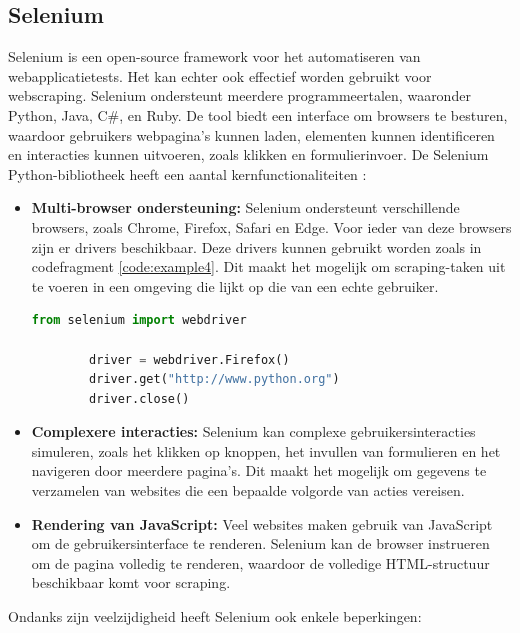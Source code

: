 \subsection{Selenium}
Selenium is een open-source framework voor het automatiseren van webapplicatietests. Het kan echter ook effectief worden gebruikt voor webscraping. Selenium ondersteunt meerdere programmeertalen, waaronder Python, Java, C#, en Ruby. De tool biedt een interface om browsers te besturen, waardoor gebruikers webpagina's kunnen laden, elementen kunnen identificeren en interacties kunnen uitvoeren, zoals klikken en formulierinvoer. De Selenium Python-bibliotheek heeft een aantal kernfunctionaliteiten \autocite{Muthukadan2011}:

\begin{itemize}
    \item \textbf{Multi-browser ondersteuning:} Selenium ondersteunt verschillende browsers, zoals Chrome, Firefox, Safari en Edge. Voor ieder van deze browsers zijn er drivers beschikbaar. Deze drivers kunnen gebruikt worden zoals in codefragment \ref{code:example4}. Dit maakt het mogelijk om scraping-taken uit te voeren in een omgeving die lijkt op die van een echte gebruiker.

    \begin{lstlisting}[language=Python, caption={voorbeeld Selenium driver}, captionpos=b, label=code:example4]
        from selenium import webdriver

        driver = webdriver.Firefox()
        driver.get("http://www.python.org")
        driver.close()
    \end{lstlisting}

    \item \textbf{Complexere interacties:} Selenium kan complexe gebruikersinteracties simuleren, zoals het klikken op knoppen, het invullen van formulieren en het navigeren door meerdere pagina's. Dit maakt het mogelijk om gegevens te verzamelen van websites die een bepaalde volgorde van acties vereisen.

    \item \textbf{Rendering van JavaScript:} Veel websites maken gebruik van JavaScript om de gebruikersinterface te renderen. Selenium kan de browser instrueren om de pagina volledig te renderen, waardoor de volledige HTML-structuur beschikbaar komt voor scraping.

\end{itemize}

Ondanks zijn veelzijdigheid heeft Selenium ook enkele beperkingen:

